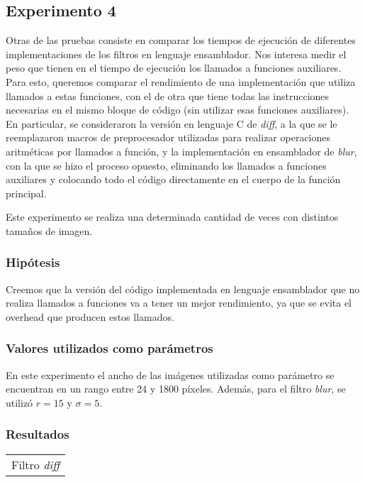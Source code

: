     \subsection{Experimento 4}
        Otras de las pruebas consiste en comparar los tiempos de ejecución de diferentes implementaciones de los filtros en lenguaje ensamblador. Nos interesa medir el peso que tienen en el tiempo de ejecución los llamados a funciones auxiliares. Para esto, queremos comparar el rendimiento de una implementación que utiliza llamados a estas funciones, con el de otra que tiene todas las instrucciones necesarias en el mismo bloque de código (sin utilizar esas funciones auxiliares).
        En particular, se consideraron la versión en lenguaje C de \emph{diff}, a la que se le reemplazaron macros de preprocesador utilizadas para realizar operaciones aritméticas por llamados a función, y la implementación en ensamblador de \emph{blur}, con la que se hizo el proceso opuesto, eliminando los llamados a funciones auxiliares y colocando todo el código directamente en el cuerpo de la función principal.
        
        Este experimento se realiza una determinada cantidad de veces con distintos tamaños de imagen.

            \subsubsection*{Hipótesis} 
                Creemos que la versión del código implementada en lenguaje ensamblador que no realiza llamados a funciones va a tener un mejor rendimiento, ya que se evita el overhead que producen estos llamados.
        
            \subsubsection*{Valores utilizados como parámetros} 
                En este experimento el ancho de las imágenes utilizadas como parámetro se encuentran en un rango entre 24 y 1800 píxeles. Además, para el filtro \emph{blur}, se utilizó $r = 15$ y $\sigma = 5$.

            \subsubsection*{Resultados}
                {\centering \begin{tabular}{c}
                    {\small Filtro \emph{diff}} \\
                \end{tabular}}

